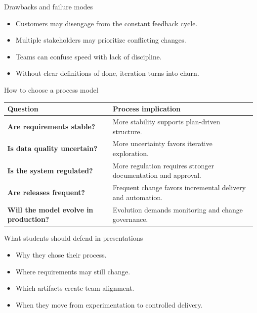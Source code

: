 \begin{frame}{Drawbacks and failure modes}
\begin{itemize}
\item Customers may disengage from the constant feedback cycle.
\item Multiple stakeholders may prioritize conflicting changes.
\item Teams can confuse speed with lack of discipline.
\item Without clear definitions of done, iteration turns into churn.
\end{itemize}
\coursefooter
\end{frame}

\begin{frame}{How to choose a process model}
\begin{tabularx}{\textwidth}{>{\bfseries}l X}
Question & Process implication \\
\toprule
Are requirements stable? & More stability supports plan-driven structure. \\
Is data quality uncertain? & More uncertainty favors iterative exploration. \\
Is the system regulated? & More regulation requires stronger documentation and approval. \\
Are releases frequent? & Frequent change favors incremental delivery and automation. \\
Will the model evolve in production? & Evolution demands monitoring and change governance. \\
\bottomrule
\end{tabularx}
\coursefooter
\end{frame}

\begin{frame}{What students should defend in presentations}
\begin{itemize}
\item Why they chose their process.
\item Where requirements may still change.
\item Which artifacts create team alignment.
\item When they move from experimentation to controlled delivery.
\end{itemize}
\coursefooter
\end{frame}


